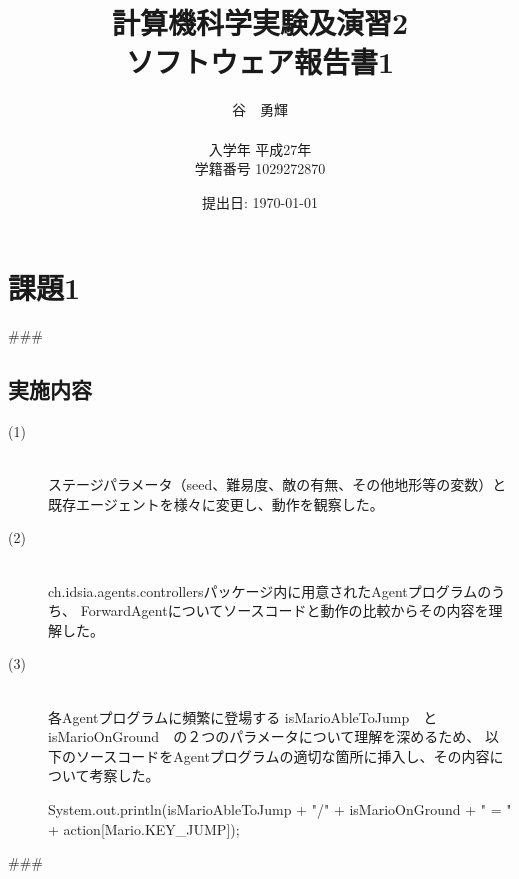 \documentclass[a4j]{jarticle}
\begin{document}
\title{計算機科学実験及演習2 \\ \bf ソフトウェア報告書1}
\author{谷　勇輝 \\ \\入学年 平成27年 \\ 学籍番号 1029272870}
\date{提出日: \today} %
\maketitle

\section{課題1}
###
\subsection{実施内容}
\begin{description}
\item[(1)]~\\
ステージパラメータ（seed、難易度、敵の有無、その他地形等の変数）と既存エージェントを様々に変更し、動作を観察した。
\item[(2)]~\\
ch.idsia.agents.controllersパッケージ内に用意されたAgentプログラムのうち、
ForwardAgentについてソースコードと動作の比較からその内容を理解した。
\item[(3)]~\\
各Agentプログラムに頻繁に登場する isMarioAbleToJump　と　 isMarioOnGround　の２つのパラメータについて理解を深めるため、
以下のソースコードをAgentプログラムの適切な箇所に挿入し、その内容について考察した。
\begin{screen}
System.out.println(isMarioAbleToJump + "/" + isMarioOnGround + " = " + action[Mario.KEY_JUMP]);
\end{screen}
\end{description}
###
\end{document}
